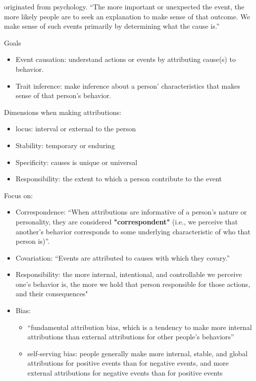 \documentclass[
]{book}
\providecommand{\tightlist}{%
  \setlength{\itemsep}{0pt}\setlength{\parskip}{0pt}}
\begin{document}
originated from psychology. ``The more important or unexpected the event, the more likely people are to seek an explanation to make sense of that outcome. We make sense of such events primarily by determining what the cause is.''

Goals

\begin{itemize}
\tightlist
\item
  Event causation: understand actions or events by attributing cause(s) to behavior.
\item
  Trait inference: make inference about a person' characteristics that makes sense of that person's behavior.
\end{itemize}

Dimensions when making attributions:

\begin{itemize}
\tightlist
\item
  locus: interval or external to the person\\
\item
  Stability: temporary or enduring\\
\item
  Specificity: causes is unique or universal\\
\item
  Responsibility: the extent to which a person contribute to the event
\end{itemize}

Focus on:

\begin{itemize}
\item
  Correspondence: ``When attributions are informative of a person's nature or personality, they are considered \textbf{"correspondent"} (i.e., we perceive that another's behavior corresponds to some underlying characteristic of who that person is)''.\\
\item
  Covariation: ``Events are attributed to causes with which they covary.''
\item
  Responsibility: the more internal, intentional, and controllable we perceive one's behavior is, the more we hold that person responsible for those actions, and their consequences"\\
\item
  Bias:

  \begin{itemize}
  \tightlist
  \item
    ``fundamental attribution bias, which is a tendency to make more internal attributions than external attributions for other people's behaviors'' \citep{Ross_1977}\\
  \item
    self-serving bias: people generally make more internal, stable, and global attributions for positive events than for negative events, and more external attributions for negative events than for positive events \citep{Malle_2006}
  \end{itemize}
\end{itemize}
\end{document}
